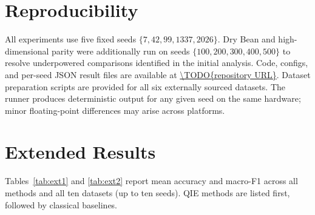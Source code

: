 \section{Reproducibility}
\label{app:repro}

All experiments use five fixed seeds $\{7, 42, 99, 1337, 2026\}$.
Dry Bean and high-dimensional parity were additionally run on seeds
$\{100, 200, 300, 400, 500\}$ to resolve underpowered comparisons identified
in the initial analysis.
Code, configs, and per-seed JSON result files are available at
\url{\TODO{repository URL}}.
Dataset preparation scripts are provided for all six externally sourced
datasets.
The runner produces deterministic output for any given seed on the same
hardware; minor floating-point differences may arise across platforms.

\section{Extended Results}
\label{app:extended}

Tables~\ref{tab:ext1} and \ref{tab:ext2} report mean accuracy and macro-F1
across all methods and all ten datasets (up to ten seeds).
QIE methods are listed first, followed by classical baselines.

